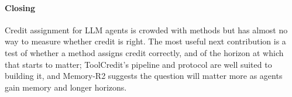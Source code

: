 \paragraph{Closing}
Credit assignment for LLM agents is crowded with methods but has almost no way to measure whether credit is right. The most useful next contribution is a test of whether a method assigns credit correctly, and of the horizon at which that starts to matter; ToolCredit's pipeline and protocol are well suited to building it, and Memory-R2 suggests the question will matter more as agents gain memory and longer horizons.
